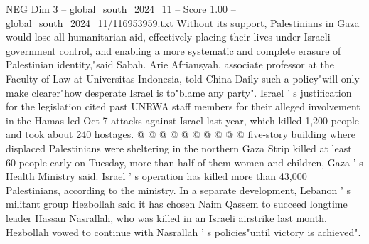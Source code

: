 \begin{textsample}{NEG Dim 3 – global\_south\_2024\_11 – Score 1.00 – global\_south\_2024\_11/116953959.txt}
Without its support, Palestinians in Gaza would lose all humanitarian aid, effectively placing their lives under Israeli government control, and enabling a more systematic and complete erasure of Palestinian identity,"said Sabah.
Arie Afriansyah, associate professor at the Faculty of Law at Universitas Indonesia, told China Daily such a policy"will only make clearer"how desperate Israel is to"blame any party".
Israel ' s justification for the legislation cited past UNRWA staff members for their alleged involvement in the Hamas-led Oct 7 attacks against Israel last year, which killed 1,200 people and took about 240 hostages. @ @ @ @ @ @ @ @ @ @ five-story building where displaced Palestinians were sheltering in the northern Gaza Strip killed at least 60 people early on Tuesday, more than half of them women and children, Gaza ' s Health Ministry said.
Israel ' s operation has killed more than 43,000 Palestinians, according to the ministry.
In a separate development, Lebanon ' s militant group Hezbollah said it has chosen Naim Qassem to succeed longtime leader Hassan Nasrallah, who was killed in an Israeli airstrike last month.
Hezbollah vowed to continue with Nasrallah ' s policies"until victory is achieved".

\end{textsample}
